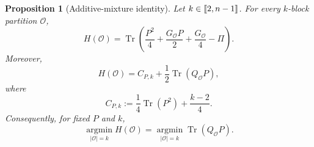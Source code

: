 \documentclass[10pt,a4paper]{amsart}
\newtheorem{proposition}{Proposition}
\providecommand{\llbracket}{\mathopen{[\mkern-2.7mu[}}
\providecommand{\rrbracket}{\mathclose{]\mkern-2.7mu]}}
\begin{document}
\begin{proposition}[Additive-mixture identity]
	\label{prop:additive-mixture-identity}
	Let $k\in\llbracket 2,n-1\rrbracket$.
	For every $k$-block partition $\mathcal O$,
	\begin{equation}
		H(\mathcal O)
		=\operatorname{Tr}\left(
		\frac{P^2}{4}
		+\frac{G_{\mathcal O}P}{2}
		+\frac{G_{\mathcal O}}{4}
		-\Pi
		\right).
		\label{eq:H-trace}
	\end{equation}
	Moreover,
	\begin{equation}
		H(\mathcal O)
		=C_{P,k}
		+\frac12\operatorname{Tr}(Q_{\mathcal O}P),
		\label{eq:H-reduction}
	\end{equation}
	where
	\begin{equation}
		C_{P,k}
		:=\frac14\operatorname{Tr}(P^2)+\frac{k-2}{4}.
		\label{eq:H-constant}
	\end{equation}
	Consequently, for fixed $P$ and $k$,
	\begin{equation*}
		\operatorname*{argmin}_{|\mathcal O|=k}H(\mathcal O)
		=
		\operatorname*{argmin}_{|\mathcal O|=k}
		\operatorname{Tr}(Q_{\mathcal O}P).
	\end{equation*}
\end{proposition}
\end{document}
